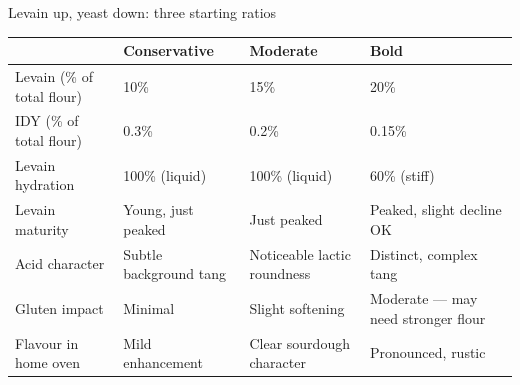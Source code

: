 \documentclass[aspectratio=169,11pt]{beamer}
\newcommand{\tablesetup}{\renewcommand{\arraystretch}{1.2}\setlength{\tabcolsep}{4pt}}
\newenvironment{tablebox}[1][\footnotesize]{\par\tablesetup#1}{\par}
\begin{document}
\begin{frame}{Levain up, yeast down: three starting ratios}
  \begin{tablebox}[\footnotesize\renewcommand{\arraystretch}{1.0}]
  \begin{tabularx}{\linewidth}{@{}L{3.3cm}L{3.3cm}L{3.9cm}Y@{}}
    \toprule
    & \textbf{Conservative} & \textbf{Moderate} & \textbf{Bold} \\
    \midrule
    Levain (\% of total flour) & 10\% & 15\% & 20\% \\
    IDY (\% of total flour) & 0.3\% & 0.2\% & 0.15\% \\
    Levain hydration & 100\% (liquid) & 100\% (liquid) & 60\% (stiff) \\
    Levain maturity & Young, just peaked & Just peaked & Peaked, slight decline OK \\
    Acid character & Subtle background tang & Noticeable lactic roundness & Distinct, complex tang \\
    Gluten impact & Minimal & Slight softening & Moderate --- may need stronger flour \\
    Flavour in home oven & Mild enhancement & Clear sourdough character & Pronounced, rustic \\
    \bottomrule
  \end{tabularx}
  \end{tablebox}
\end{frame}
\end{document}
